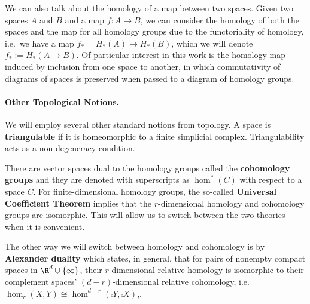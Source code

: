     We can also talk about the homology of a map between two spaces.
    Given two spaces $A$ and $B$ and a map $f:A\rightarrow B$, we can consider the homology of both the spaces and the map for all homology groups due to the functoriality of homology, i.e.~we have a map $f_*=H_*(A)\rightarrow H_*(B)$, which we will denote $f_*:=H_*(A\rightarrow B)$.
    Of particular interest in this work is the homology map induced by inclusion from one space to another, in which commutativity of diagrams of spaces is preserved when passed to a diagram of homology groups.

\paragraph*{\textbf{Other Topological Notions.}} %
\label{par:other_topological_notions}
    We will employ several other standard notions from topology.
    A space is \textbf{triangulable} if it is homeomorphic to a finite simplicial complex.
    Triangulability acts as a non-degeneracy condition.

    There are vector spaces dual to the homology groups called the \textbf{cohomology groups} and they are denoted with superscripts as $\hom^*(C)$ with respect to a space $C$.
    For finite-dimensional homology groups, the so-called \textbf{Universal Coefficient Theorem} implies that the $r$-dimensional homology and cohomology groups are isomorphic.
    This will allow us to switch between the two theories when it is convenient.

    The other way we will switch between homology and cohomology is by \textbf{Alexander duality} which states, in general, that for pairs of nonempty compact spaces in $\R^d\cup \{\infty\}$, their $r$-dimensional relative homology is isomorphic to their complement spaces' $(d-r)$-dimensional relative cohomology, i.e.\ $\hom_r(X,Y)\cong \hom^{d-r}(\comp{Y},\comp{X})$,.


